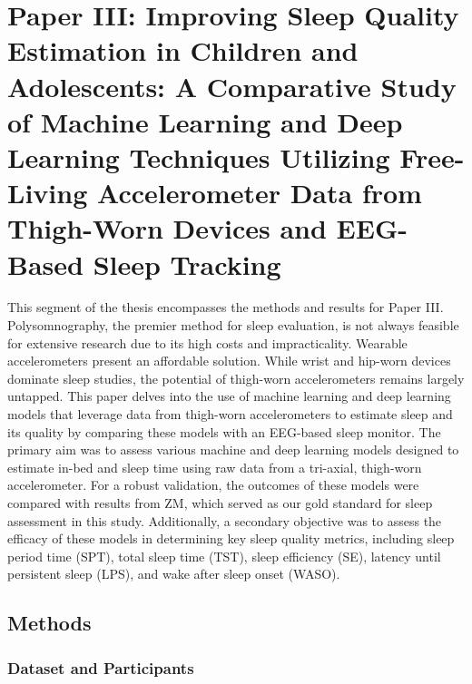 \documentclass[
  10pt,
]{scrbook}
\begin{document}
\hypertarget{paper-iii-improving-sleep-quality-estimation-in-children-and-adolescents-a-comparative-study-of-machine-learning-and-deep-learning-techniques-utilizing-free-living-accelerometer-data-from-thigh-worn-devices-and-eeg-based-sleep-tracking}{%
\chapter{Paper III: Improving Sleep Quality Estimation in Children and
Adolescents: A Comparative Study of Machine Learning and Deep Learning
Techniques Utilizing Free-Living Accelerometer Data from Thigh-Worn
Devices and EEG-Based Sleep
Tracking}\label{paper-iii-improving-sleep-quality-estimation-in-children-and-adolescents-a-comparative-study-of-machine-learning-and-deep-learning-techniques-utilizing-free-living-accelerometer-data-from-thigh-worn-devices-and-eeg-based-sleep-tracking}}

This segment of the thesis encompasses the methods and results for Paper
III. Polysomnography, the premier method for sleep evaluation, is not
always feasible for extensive research due to its high costs and
impracticality. Wearable accelerometers present an affordable solution.
While wrist and hip-worn devices dominate sleep studies, the potential
of thigh-worn accelerometers remains largely untapped. This paper delves
into the use of machine learning and deep learning models that leverage
data from thigh-worn accelerometers to estimate sleep and its quality by
comparing these models with an EEG-based sleep monitor. The primary aim
was to assess various machine and deep learning models designed to
estimate in-bed and sleep time using raw data from a tri-axial,
thigh-worn accelerometer. For a robust validation, the outcomes of these
models were compared with results from ZM, which served as our gold
standard for sleep assessment in this study. Additionally, a secondary
objective was to assess the efficacy of these models in determining key
sleep quality metrics, including sleep period time (SPT), total sleep
time (TST), sleep efficiency (SE), latency until persistent sleep (LPS),
and wake after sleep onset (WASO).

\hypertarget{methods-2}{%
\section{Methods}\label{methods-2}}

\hypertarget{dataset-and-participants}{%
\subsection{Dataset and Participants}\label{dataset-and-participants}}
\end{document}
